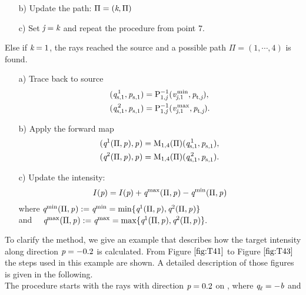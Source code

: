 \begin{enumerate}
\begin{itemize}
\item[b)] Update the path: $\Pi = (\textit{k}, \Pi)$
\item[c)] Set $\textit{j}=\textit{k}$ and repeat the procedure from point $7$.
\end{itemize}
Else if $\textit{k}=1$, the rays reached the source and a possible path $\Pi = (1, \cdots, 4)$ is found. 
\begin{itemize}
\item[a)]
Trace back to source
\begin{equation*}
\begin{aligned}
(\textit{q}_{\textrm{s,} \textit{$1$}}^{\,1}, \textit{p}_{\textrm{s,} \textit{$1$}})& = \mathrm{P}_{{1,\textit{j}}}^{-1}(\textit{v}_{\textit{j}, 1}^\textrm{\,min}, \textit{p}_{\textrm{t,} \textit{\textit{j}}}),  \\
(\textit{q}_{\textrm{s,} \textit{$1$}}^{\,2}, \textit{p}_{\textrm{s,} \textit{$1$}}) & =\mathrm{P}_{{1,\textit{j}}}^{-1}(\textit{v}_{\textit{j}, 1}^\textrm{\,max}, \textit{p}_{\textrm{t,} \textit{\textit{j}}}).
\end{aligned}
\end{equation*}
\item[b)] Apply the forward map
\begin{equation*}
\begin{aligned}
 (\textit{q}_{\textrm{} \textit{}}^{1}(\Pi, \textit{p}_{\textrm{} \textit{}}), \textit{p}_{\textrm{} \textit{}})&= \mathrm{M}_{1,4}(\Pi)(\textit{q}_{\textrm{s,} \textit{$1$}}^{\,1}, \textit{p}_{\textrm{s,} \textit{$1$}}),\\
 (\textit{q}_{\textrm{} \textit{}}^{2}(\Pi, \textit{p}_{\textrm{} \textit{}}), \textit{p}_{\textrm{} \textit{}})&= \mathrm{M}_{1,4}(\Pi)(\textit{q}_{\textrm{s,} \textit{$1$}}^{\,2}, \textit{p}_{\textrm{s,} \textit{$1$}}).
\end{aligned}
\end{equation*}
\item[c)] Update the intensity: $$I(\textit{p}) = I(\textit{p})+\textit{q}_{\textrm{} \textit{}}^{\textrm{max}}(\Pi, \textit{p}_{\textrm{} \textit{}})- \textit{q}_{\textrm{} \textit{}}^{\textrm{min}}(\Pi, \textit{p}_{\textrm{} \textit{}})$$
where 
$\textit{q}_{\textrm{} \textit{}}^\textrm{min}(\Pi, \textit{p}_{\textrm{} \textit{}}) := \textit{q}_{\textrm{} \textit{}}^\textrm{min} =\min\{ \textit{q}_{\textrm{} \textit{}}^{1}(\Pi, \textit{p}_{\textrm{} \textit{}}), \textit{q}_{\textrm{} \textit{}}^{2}(\Pi, \textit{p}_{\textrm{} \textit{}})\}$ \\ and $\quad\textit{q}_{\textrm{} \textit{}}^\textrm{max}(\Pi, \textit{p}_{\textrm{} \textit{}}) := \textit{q}_{\textrm{} \textit{}}^\textrm{max} =\max\{\textit{q}_{\textrm{} \textit{}}^{1}(\Pi, \textit{p}_{\textrm{} \textit{}}), \textit{q}_{\textrm{} \textit{}}^{2}(\Pi, \textit{p}_{\textrm{} \textit{}})\}.$
\end{itemize}
\end{enumerate}
\indent
To clarify the method, we give an example that describes how the target intensity along direction $\textit{p}= -0.2$ is calculated.
From Figure $\ref{fig:T41}$ to Figure $\ref{fig:T43}$ the steps used in this example are shown.
A detailed description of those figures is given in the following.
\\ \indent The procedure starts with the rays with direction $\textit{p} = 0.2$ on , where $\textit{q}_\ell= -\textit{b}$ and
